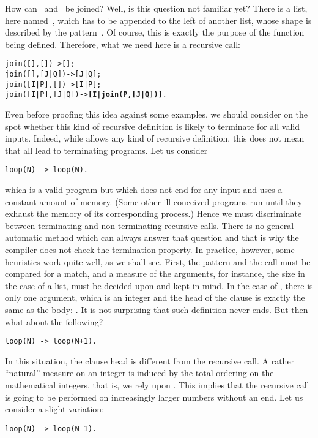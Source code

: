 How can ~and~\erlcode{[J|Q]} be joined? Well, is this
question not familiar yet? There is a list, here named~,
which has to be appended to the left of another list, whose shape is
described by the pattern~\erlcode{[J|Q]}. Of course, this is exactly
the purpose of the function  being defined. Therefore,
what we need here is a recursive call:
\begin{alltt}
join(   [],   []) -> [];
join(   [],[J|Q]) -> [J|Q];
join([I|P],   []) -> [I|P];
join([I|P],[J|Q]) -> \textbf{[I|join(P,[J|Q])]}.
\end{alltt}
\noindent Even before proofing this idea against some examples, we
should consider on the spot whether this kind of recursive definition
is likely to terminate for all valid inputs. Indeed, while \Erlang
allows any kind of recursive definition, this does not mean that all
lead to terminating programs. Let us consider
\begin{verbatim}
loop(N) -> loop(N).
\end{verbatim}
which is a valid program but which does not end for any input and uses
a constant amount of memory. (Some other ill\hyp{}conceived programs
run until they exhaust the memory of its corresponding process.) Hence
we must discriminate between terminating and non\hyp{}terminating
recursive calls. There is no general automatic method which can always
answer that question and that is why the \Erlang compiler does not
check the termination property. In practice, however, some heuristics
work quite well, as we shall see. First, the pattern and the call must
be compared for a match, and a measure of the arguments, for instance,
the size in the case of a list, must be decided upon and kept in
mind. In the case of , there is only one argument,
which is an integer and the head of the clause is exactly the same as
the body: . It is not surprising that such definition
never ends. But then what about the following?
\begin{verbatim}
loop(N) -> loop(N+1).
\end{verbatim}
In this situation, the clause head is different from the recursive
call. A rather ``natural'' measure on an integer is induced by the
total ordering on the mathematical integers, that is, we rely upon
. This implies that the recursive call is going to
be performed on increasingly larger numbers without an end. Let us
consider a slight variation:
\begin{verbatim}
loop(N) -> loop(N-1).
\end{verbatim}
